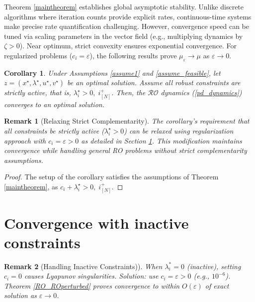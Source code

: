 \documentclass[journal,twoside,web]{ieeecolor}
\newcommand{\rev}[1]{\textcolor{revisionblue}{#1}}
\newtheorem{corollary}{Corollary}
\newtheorem{remark}{Remark}
\begin{document}
\rev{Theorem \ref{maintheorem} establishes global asymptotic stability. Unlike discrete algorithms where iteration counts provide explicit rates, continuous-time systems make precise rate quantification challenging. However, convergence speed can be tuned via scaling parameters in the vector field (e.g., multiplying dynamics by $\zeta > 0$). Near optimum, strict convexity ensures exponential convergence. For regularized problems ($c_i = \varepsilon$), the following results prove $\mu_\varepsilon \to \mu$ as $\varepsilon \to 0$.}

\begin{corollary}
Under Assumptions \ref{assume1} and \ref{assume_feasible}, let $z=(x^\star,\lambda^\star,u^\star,v^\star)$ be an optimal solution.
Assume all robust constraints are strictly active, that is, $\lambda_i^\star>0,\;i^+_{[N]}$. Then, the $\mathcal{RO}$ dynamics (\ref{pd_dynamics}) converges to an optimal solution.
\end{corollary}

\begin{remark}[\rev{Relaxing Strict Complementarity}]
\rev{The corollary's requirement that all constraints be strictly active ($\lambda_i^\star > 0$) can be relaxed using 
regularization approach with $c_i = \varepsilon > 0$ as detailed in Section \ref{perturbed_section_pddynamics}. This modification maintains convergence while handling general RO problems without strict complementarity assumptions.}
\end{remark}
\begin{proof}
The setup of the corollary satisfies the assumptions of Theorem \ref{maintheorem}, as $c_i+\lambda_i^\star>0,\;i^+_{[N]}$.
\end{proof}


\section{Convergence with inactive constraints} \label{perturbed_section_pddynamics}

\begin{remark}[\rev{Handling Inactive Constraints)}]
\rev{When $\lambda_i^* = 0$ (inactive), setting $c_i = 0$ causes Lyapunov singularities. Solution: use $c_i = \varepsilon > 0$ (e.g., $10^{-6}$). Theorem \ref{RO_ROperturbed} proves convergence to within $O(\varepsilon)$ of exact solution as $\varepsilon \to 0$.}
\end{remark}
\end{document}
